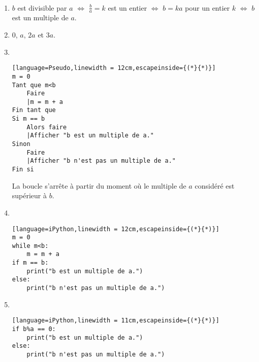 \begin{correction}~
	\begin{enumerate}
		\item $b$ est divisible par $a$ $\iff$ $\frac{b}{a}=k$ est un entier $\iff$ $b=ka$ pour un entier $k$ $\iff$ $b$ est un multiple de $a$.
		\item $0$, $a$, $2a$ et $3a$.
		\item ~
\begin{center}
	\begin{varwidth}[t]{.5\textwidth}
		\begin{lstlisting}[language=Pseudo,linewidth = 12cm,escapeinside={(*}{*)}]
m = 0
Tant que m<b
    Faire
    |m = m + a
Fin tant que
Si m == b
    Alors faire
    |Afficher "b est un multiple de a."
Sinon
	Faire
	|Afficher "b n'est pas un multiple de a."
Fin si
\end{lstlisting}	
	\end{varwidth}
\end{center}La boucle s'arrête à partir du moment où le multiple de $a$ considéré est supérieur à $b$.
\item ~
\begin{center}
	\begin{varwidth}[t]{.5\textwidth}
		\begin{lstlisting}[language=iPython,linewidth = 12cm,escapeinside={(*}{*)}]
m = 0
while m<b:
    m = m + a
if m == b:
    print("b est un multiple de a.")
else:
	print("b n'est pas un multiple de a.")
\end{lstlisting}	
	\end{varwidth}
\end{center}
\item ~
\begin{center}
	\begin{varwidth}[t]{.5\textwidth}
		\begin{lstlisting}[language=iPython,linewidth = 11cm,escapeinside={(*}{*)}]
if b%a == 0:
    print("b est un multiple de a.")
else:
    print("b n'est pas un multiple de a.")
\end{lstlisting}	
	\end{varwidth}
\end{center}
\end{enumerate}
\end{correction}



